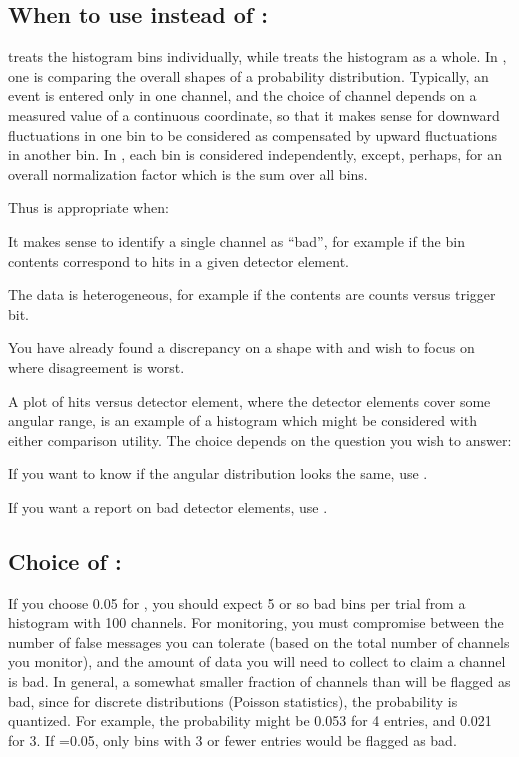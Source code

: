 \subsection*{When to use  instead of :}

 treats the histogram bins individually, while 
treats the histogram as a whole.  
In , one is comparing the overall shapes of a
probability distribution. 
Typically, an event is entered only in one
channel, and the choice of channel depends on a measured value of a continuous
coordinate, so that it makes sense for downward fluctuations in one bin to be
considered as compensated by upward fluctuations in another bin.  
In ,
each bin is considered independently, except, perhaps, for an overall
normalization factor which is the sum over all bins.

Thus  is appropriate when:
\begin{UL}
\item It makes sense to identify a single channel as ``bad'', 
      for example if the bin contents correspond to hits in a 
      given detector element.
\item The data is heterogeneous, for example if the contents 
      are counts versus trigger bit.
\item You have already found a discrepancy on a shape with  
      and wish to focus on where disagreement is worst.
\end{UL}

A plot of hits versus detector element, where the detector elements
cover some angular range, is an example of a histogram which might 
be considered with either comparison utility.  
The choice depends on the question you wish to answer:

\begin{UL}
\item If you want to know if the angular distribution looks the same, 
      use .
\item If you want a report on bad detector elements, use .
\end{UL}

\subsection{Choice of \protect{}:}

If you choose 0.05 for , you should expect 5 or so bad bins per
trial from a histogram with 100 channels.  
For monitoring, you must compromise
between the number of false messages you can tolerate (based on the total
number of channels you monitor), and the amount of data you will need to
collect to claim a channel is bad.  
In general, a somewhat smaller fraction of
channels than  will be flagged as bad, 
since for discrete distributions
(Poisson statistics), the probability is quantized.  
For example, the probability might be 0.053 for 4 entries, and 0.021 for 3.  
If =0.05, only bins with 3 or fewer entries would be flagged as bad.

